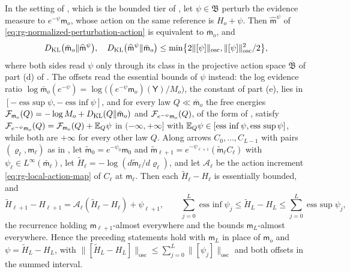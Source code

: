 In the setting of , which is the bounded tier of
, let $\psi\in\mathfrak B$ perturb the evidence
measure to $e^{-\psi}\mathsf m_o$, whose action on the same
reference is $H_o+\psi$. Then $\widehat{\mathsf m}^\psi$ of
\eqref{eq:rg-normalized-perturbation-action} is equivalent to $\bar{\mathsf m}_o$, and
\begin{equation}
D_{\mathrm{KL}}\bigl(\bar{\mathsf m}_o\Vert\widehat{\mathsf m}^\psi\bigr),\quad
D_{\mathrm{KL}}\bigl(\widehat{\mathsf m}^\psi\Vert\bar{\mathsf m}_o\bigr)
\le\min\bigl\{2\lVert[\psi]\rVert_{\mathrm{osc}},\lVert[\psi]\rVert_{\mathrm{osc}}^2/2\bigr\},
\label{eq:rg-perturbation-two-sided-kl}
\end{equation}
where both sides read $\psi$ only through its class in the projective action space
$\overline{\mathfrak B}$ of part (d) of . The
offsets read the essential bounds of $\psi$ instead: the log evidence ratio
$\log\bar{\mathsf m}_o(e^{-\psi})=\log\bigl((e^{-\psi}\mathsf m_o)(\mathsf Y)/M_o\bigr)$,
the constant of part (e), lies in
$[-\operatorname*{ess~sup}\psi,-\operatorname*{ess~inf}\psi]$, and for every law
$Q\ll\bar{\mathsf m}_o$ the free energies
$\mathcal F_{\mathsf m_o}(Q)=-\log M_o+D_{\mathrm{KL}}(Q\Vert\bar{\mathsf m}_o)$ and
$\mathcal F_{e^{-\psi}\mathsf m_o}(Q)$, of the form of ,
satisfy $\mathcal F_{e^{-\psi}\mathsf m_o}(Q)=\mathcal F_{\mathsf m_o}(Q)+\mathbb E_Q\psi$ in
$(-\infty,+\infty]$ with
$\mathbb E_Q\psi\in[\operatorname*{ess~inf}\psi,\operatorname*{ess~sup}\psi]$, while both are
$+\infty$ for every other law $Q$. Along arrows $C_0,\ldots,C_{L-1}$ with pairs
$(\varrho_\ell,\mathsf m_\ell)$ as in , let
$\widetilde{\mathsf m}_0=e^{-\psi_0}\mathsf m_0$ and
$\widetilde{\mathsf m}_{\ell+1}=e^{-\psi_{\ell+1}}(\widetilde{\mathsf m}_\ell C_\ell)$ with
$\psi_\ell\in L^\infty(\bar{\mathsf m}_\ell)$, let
$\widetilde H_\ell=-\log(d\widetilde{\mathsf m}_\ell/d\varrho_\ell)$, and let
$\mathcal A_\ell$ be the action increment \eqref{eq:rg-local-action-map} of $C_\ell$
at $\mathsf m_\ell$. Then each $\widetilde H_\ell-H_\ell$ is essentially bounded, and
\begin{equation}
\widetilde H_{\ell+1}-H_{\ell+1}=\mathcal A_\ell(\widetilde H_\ell-H_\ell)+\psi_{\ell+1},
\qquad
\sum_{j=0}^{L}\operatorname*{ess~inf}\psi_j
\le\widetilde H_L-H_L
\le\sum_{j=0}^{L}\operatorname*{ess~sup}\psi_j,
\label{eq:rg-perturbation-tower}
\end{equation}
the recurrence holding $\mathsf m_{\ell+1}$-almost everywhere and the bounds
$\mathsf m_L$-almost everywhere. Hence the preceding statements hold with
$\mathsf m_L$ in place of $\mathsf m_o$ and $\psi=\widetilde H_L-H_L$, with
$\lVert[\widetilde H_L-H_L]\rVert_{\mathrm{osc}}\le\sum_{j=0}^{L}\lVert[\psi_j]\rVert_{\mathrm{osc}}$
and both offsets in the summed interval. 

